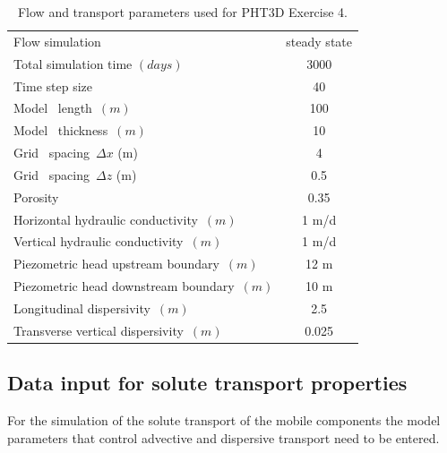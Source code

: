 \begin{table}
\caption{Flow and transport parameters used for PHT3D Exercise 4.}
\begin{center}
\begin{tabular}{lc}
\toprule
Flow simulation                     & steady state \\
Total simulation time $(days)$       & 3000 \\
Time step size                       & 40 \\
Model \  length\ $ (m)      $         &  100            \\
Model \  thickness\ $ (m)      $         &  10            \\
Grid \ spacing\ $\Delta x $ (m)                &    4            \\
Grid \ spacing\ $\Delta z $ (m)                &    0.5            \\
Porosity\     $            $         &  0.35           \\
Horizontal hydraulic conductivity\ $(m)           $         &  1 m/d         \\ 
Vertical   hydraulic conductivity\ $(m)           $         &  1 m/d         \\ 
Piezometric head upstream boundary\ $(m)          $         &  12 m          \\ 
Piezometric head downstream boundary\ $(m)        $         &  10 m          \\ 
Longitudinal dispersivity\ $(m)         $         &  2.5          \\ 
Transverse vertical dispersivity\ $(m)         $         &  0.025          \\ 
\bottomrule

\end{tabular}
\label{bruno_flow}
\end{center}
\end{table}


\subsection[Data input for solute transport properties]{Data input for solute transport properties}

For the simulation of the solute transport of the mobile components the model parameters that control advective and dispersive transport need to be entered. 

